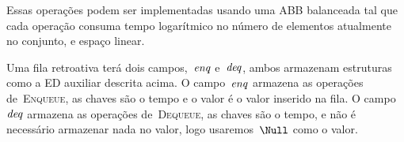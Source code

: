 \documentclass[../../main.tex]{subfiles}
\begin{document}
Essas operações podem ser implementadas usando uma ABB balanceada tal que cada operação consuma tempo logarítmico no número de elementos atualmente no conjunto, e espaço linear.

\newcommand{\deqs}{\V{deq}}
\newcommand{\enqs}{\V{enq}}

Uma fila retroativa terá dois campos,~$\enqs$ e~$\deqs$, ambos armazenam estruturas como a ED auxiliar descrita acima. O campo~$\enqs$ armazena as operações de~\textsc{Enqueue}, as chaves são o tempo e o valor é o valor inserido na fila. O campo~$\deqs$ armazena as operações de~\textsc{Dequeue}, as chaves são o tempo, e não é necessário armazenar nada no valor, logo usaremos~$\Null$ como o valor.
\end{document}
